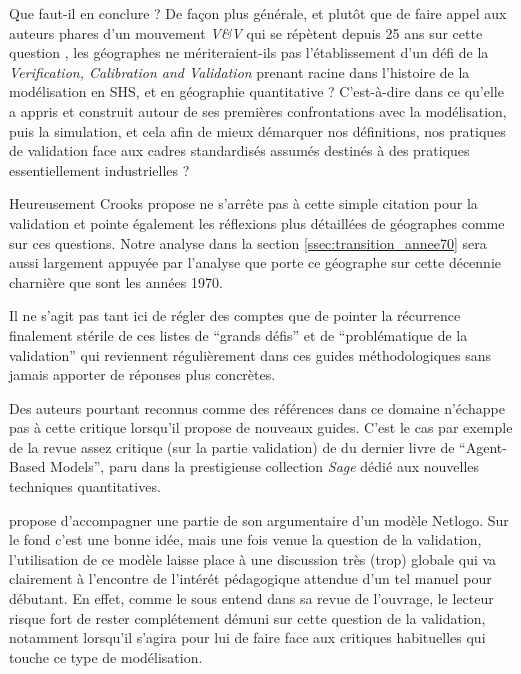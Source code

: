 Que faut-il en conclure ? De façon plus générale, et plutôt que de faire appel aux auteurs phares d'un mouvement \textit{V\&V} qui se répètent depuis 25 ans sur cette question \autocite{Sargent1983, Sargent2010}, les géographes ne mériteraient-ils pas l'établissement d'un défi de la \textit{Verification, Calibration and Validation} prenant racine dans l'histoire de la modélisation en SHS, et en géographie quantitative ? C'est-à-dire dans ce qu'elle a appris et construit autour de ses premières confrontations avec la modélisation, puis la simulation, et cela afin de mieux démarquer nos définitions, nos pratiques de validation face aux cadres standardisés assumés destinés à des pratiques essentiellement industrielles ?

Heureusement Crooks propose ne s'arrête pas à cette simple citation pour la validation et pointe également les réflexions plus détaillées de géographes comme \textcites{Batty2001, Batty2005b} sur ces questions. Notre analyse dans la section \ref{ssec:transition_annee70} sera aussi largement appuyée par l'analyse que porte ce géographe sur cette décennie charnière que sont les années 1970.

Il ne s'agit pas tant ici de régler des comptes que de pointer la récurrence finalement stérile de ces listes de \enquote{grands défis} et de \enquote{problématique de la validation} qui reviennent régulièrement dans ces guides méthodologiques sans jamais apporter de réponses plus concrètes.

Des auteurs pourtant reconnus comme des références dans ce domaine n'échappe pas à cette critique lorsqu'il propose de nouveaux guides. C'est le cas par exemple de la revue assez critique (sur la partie validation) de \textcite{Manzo2007a} du dernier livre de \textcite{Gilbert2008} \foreignquote{english}{Agent-Based Models}, paru dans la prestigieuse collection \textit{Sage} dédié aux nouvelles techniques quantitatives.

\textcite{Gilbert2008} propose d'accompagner une partie de son argumentaire d'un modèle Netlogo. Sur le fond c'est une bonne idée, mais une fois venue la question de la validation, l'utilisation de ce modèle laisse place à une discussion très (trop) globale qui va clairement à l'encontre de l'intérét pédagogique attendue d'un tel manuel pour débutant. En effet, comme le sous entend \textcite{Manzo2007a} dans sa revue de l'ouvrage, le lecteur risque fort de rester complétement démuni sur cette question de la validation, notamment lorsqu'il s'agira pour lui de faire face aux critiques habituelles qui touche ce type de modélisation.

